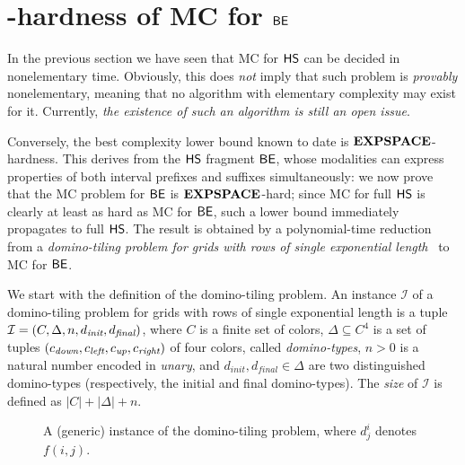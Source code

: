 \newcommand{\Instance}{\mathcal{I}}
\newcommand{\Beg}{\textit{beg}}
\newcommand{\End}{\textit{end}}
\newcommand{\Left}{\textit{left}}
\newcommand{\Right}{\textit{right}}
\newcommand{\Down}{\textit{down}}
\newcommand{\Up}{\textit{up}}
\newcommand{\Init}{\textit{init}}
\newcommand{\Final}{\textit{final}}


\section{\EXPSPACE-hardness of MC for $\mathsf{BE}$}\label{sec:BEhard}

In the previous section we have seen that MC for $\text{\sffamily HS}$ can be decided in nonelementary time. 
Obviously, this does \emph{not} imply that such problem is \emph{provably} nonelementary, meaning that no algorithm with elementary complexity may exist for it. Currently, \emph{the existence of such an algorithm is still an open issue}.

Conversely, the best complexity lower bound known to date is $\textbf{EXPSPACE}$-hardness. This derives from the $\text{\sffamily HS}$ fragment $\mathsf{BE}$, whose modalities can express properties of both interval prefixes and suffixes
simultaneously: %
we now prove that the MC problem for $\mathsf{BE}$
is $\textbf{EXPSPACE}$-hard; since MC for full $\text{\sffamily HS}$ is clearly at least as hard as MC for $\mathsf{BE}$, such a lower bound immediately propagates to full $\text{\sffamily HS}$. 
The result is obtained by a polynomial-time reduction from a \emph{domino-tiling problem for grids with rows of single exponential length}~\cite{harel92} to MC for $\mathsf{BE}$. 

We start with the definition of the domino-tiling problem.
%
An instance $\Instance$ of a domino-tiling problem for grids with rows of single exponential length is a tuple $\Instance =\tupleof{C,\Delta,n,d_\Init,d_\Final}$, where $C$ is a finite set of colors, $\Delta \subseteq C^{4}$ is a set of tuples $\tupleof{c_\Down,c_\Left,c_\Up,c_\Right}$ of four colors, called \emph{domino-types}, $n>0$ is a  natural number encoded in \emph{unary},
and $d_\Init,d_\Final\in\Delta$ are two distinguished domino-types (respectively, the initial and final domino-types).
The \emph{size} of $\Instance$ is defined as $|C|+|\Delta|+n$.

\begin{figure}[b]
    \centering
    \resizebox{\linewidth}{!}{}
    \caption{A (generic) instance of the domino-tiling problem, where $d^i_j$ denotes $f(i,j)$.}\label{fig:til}
\end{figure}

